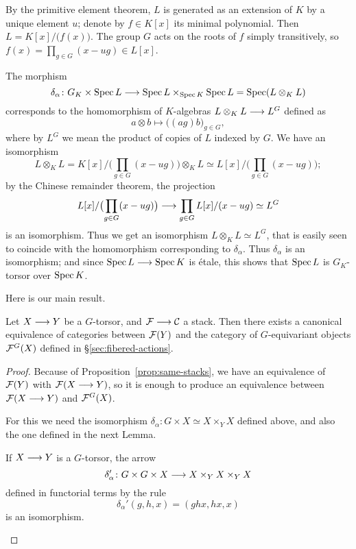 \begin{4   STACKS}
\begin{4.4 Descent along torsors}
\begin{example}
By the primitive element theorem, $L$ is generated as an extension of $K$ by a unique  element $u$; denote by $f \in K[x]$ its minimal polynomial. Then $L = K[x]/\bigl(f(x)\bigr)$. The group $G$ acts on the roots of $f$ simply transitively, so $f(x) = \prod_{g \in G}(x - ug) \in L[x]$.

The morphism
   \[
   \delta_\alpha \colon G_{K} \times \spec L
   \arr \spec L \times_{\spec K} \spec L
      = \spec(L\otimes_{K} L)
   \]
corresponds to the homomorphism of $K$-algebras $L \otimes_{K}L \arr L^{G}$ defined as
   \[
   a \otimes b \mapsto \bigl((ag)b\bigr)_{g\in G},
   \]
where by $L^{G}$ we mean the product of copies of $L$ indexed by $G$. We have an isomorphism
   \[
   L \otimes_{K} L = K[x]/\bigl( \prod_{g \in G}(x - ug)\bigr)\otimes_{K} L 
   \simeq L[x]/\bigl( \prod_{g \in G}(x - ug)\bigr);
   \]
by the Chinese remainder theorem, the projection
   \[
   L[x]/\bigl( \prod_{g \in G}(x - ug)\bigr) \arr \prod_{g \in G}L[x]/(x-ug)
   \simeq L^{G}
   \]
is an isomorphism. Thus we get an isomorphism $L\otimes_{K} L \simeq L^{G}$, that is easily seen to coincide with the homomorphism corresponding to $\delta_{\alpha}$. Thus $\delta_{\alpha}$ is an isomorphism; and since $\spec L \arr \spec K$ is \'etale, this shows that $\operatorname{Spec} L$ is $G_{K}$-torsor over $\operatorname{Spec} K$.
\end{example}

Here is our main result.

\begin{theorem}
Let $X \arr Y$ be a $G$-torsor, and $\cF \arr \cC$ a stack. Then there exists a canonical equivalence of categories between $\mathcal{F}(Y)$ and the category of $G$-equivariant objects $\mathcal{F}^{G}(X)$ defined in \S\ref{sec:fibered-actions}.
\end{theorem}

\begin{proof}
Because of Proposition~\ref{prop:same-stacks}, we have an equivalence of $\mathcal{F}(Y)$ with $\mathcal{F}(X \longrightarrow Y)$, so it is enough to produce an equivalence between $\mathcal{F}(X \longrightarrow Y)$ and $\mathcal{F}^{G}(X)$.

For this we need the isomorphism $\delta_{\alpha} \colon G \times X \simeq X \times_{Y} X$ defined above, and also the one defined in the next Lemma.

\begin{lemma}
If $X \arr Y$ is a $G$-torsor, the arrow
   \[
   \delta_{\alpha}' \colon G \times G \times X 
      \arr X \times_{Y} X \times_{Y} X
   \]
defined in functorial terms by the rule
   \[
    \delta_{\alpha}'(g, h, x) = (ghx, hx, x)
   \]
is an isomorphism.
\end{lemma}


\end{proof}
\end{4.4 Descent along torsors}
\end{4   STACKS}
